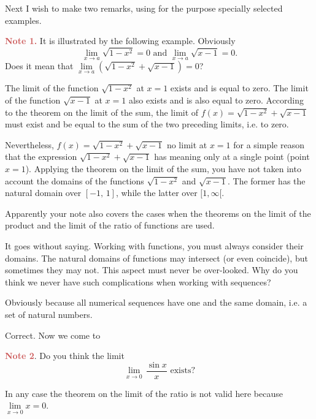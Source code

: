 {\athr Next I wish to make two remarks, using for the purpose specially selected examples.

\textcolor{IndianRed}{\textbf{Note 1.}} It is illustrated by the following example. Obviously
\begin{equation*}%
 \lim\limits_{x \to a} \sqrt{1 - x^{2}} = 0 \,\, \text{and} \,\,  \lim\limits_{x \to a} \sqrt{x - 1} = 0.
  \end{equation*}
  Does it mean that  $\lim\limits_{x \to a} ( \sqrt{1 - x^{2}} + \sqrt{x - 1}) = 0$? 

\rdr The limit of the function $\sqrt{1 - x^{2}}$ at $x = 1$ exists and is equal to zero. The limit of the function $\sqrt{x - 1}$ at $x = 1$ also exists and is also equal to zero. According to the theorem on the limit of the sum, the limit of $f (x) = \sqrt{1 - x^{2}} + \sqrt{x - 1}$ must exist and be equal to the
sum of the two preceding limits, i.e. to zero.

\athr Nevertheless, $f (x) = \sqrt{1 - x^{2}} + \sqrt{x - 1}$ no limit at $x = 1$ for a simple reason that the expression $\sqrt{1 - x^{2}} + \sqrt{x - 1}$ has meaning only at a single point (point $x = 1$). Applying the theorem on the limit of the sum, you have not taken into account the domains of the functions  $\sqrt{1 - x^{2}}$ and  $ \sqrt{x - 1}$. The former has the natural domain over $[-1, \,1]$, while the latter over $[1, \infty[$. 

\rdr Apparently your note also covers the cases when the theorems on the limit of the product and the limit of the ratio of functions are used.

\athr It goes without saying. Working with functions, you must always consider their domains. The natural domains of functions may intersect (or even coincide), but sometimes they may not. This aspect must never be over-looked. Why do you think we never have such complications when working with sequences?

\rdr Obviously because all numerical sequences have one and the same domain, i.e. a set of natural numbers. 

\athr Correct. Now we come to 

\textcolor{IndianRed}{\textbf{Note 2}}. Do you think the limit
\begin{equation*}%
  \lim\limits_{x \to 0} \, \frac{\sin x}{x} \,\, \text{exists?}
  \end{equation*}
  
\rdr In any case the theorem on the limit of the ratio is not valid here because  $\lim\limits_{x \to 0} x = 0$.

}
